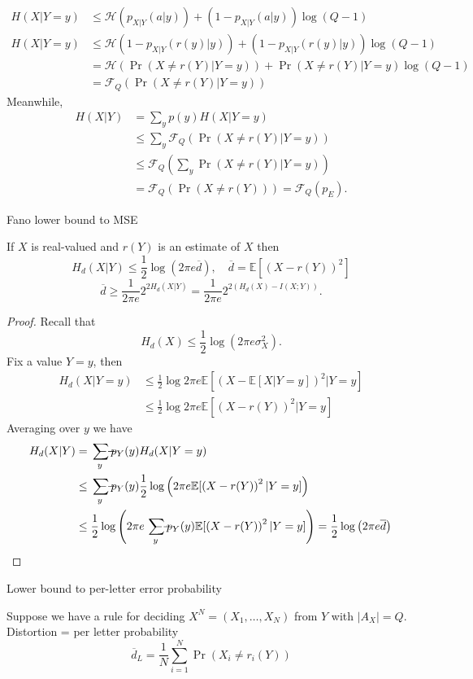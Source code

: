 \documentclass{report}
\newcommand{\matE}{\mathbb{E}}
\def \ssumsym {\mathrlap{\ \ --}\sum}
\DeclareMathOperator*{\ssum}{\ssumsym}
\theoremstyle{definition}
\theoremstyle{remark}
\numberwithin{equation}{section}
\begin{document}
\begin{align*}
  H(X|Y = y) & \leq \mathscr{H}(p_{X|Y}(a|y)) + (1 - p_{X|Y}(a|y))\log(Q - 1) \\
  H(X|Y = y) & \leq \mathscr{H}(1 - p_{X|Y}(r(y)|y)) + (1 - p_{X|Y}(r(y)|y))\log(Q - 1) \\
  & = \mathscr{H}(\Pr(X \neq r(Y)|Y = y)) + \Pr(X \neq r(Y)|Y = y)\log(Q - 1) \\
  & = \mathscr{F}_Q(\Pr(X \neq r(Y)|Y = y))
\end{align*}
Meanwhile, 
\begin{align*}
  H(X | Y) & = \sum_y p(y)H(X|Y = y) \\
  & \leq \sum_y \mathscr{F}_Q(\Pr(X \neq r(Y)|Y = y)) \\
  & \leq \mathscr{F}_Q\left(\sum_y \Pr(X \neq r(Y)|Y = y)\right) \\
  & = \mathscr{F}_Q(\Pr(X \neq r(Y))) = \mathscr{F}_Q(p_E).
\end{align*}

Fano lower bound to MSE

If $X$ is real-valued and $r(Y)$ is an estimate of $X$ then \[
  H_d(X|Y) \leq \frac{1}{2}\log(2\pi e \overline{d}),  \quad \overline{d} = \matE[(X - r(Y))^2]  
  \]\[\overline{d} \geq \frac{1}{2\pi e}2^{2H_d(X|Y)} = \frac{1}{2\pi e}2^{2(H_d(X) - I(X;Y))}.\]

\begin{proof}
  Recall that \[H_d(X) \leq \frac{1}{2}\log (2\pi e \sigma_X^2).\]
  Fix a value $Y = y$, then
  \begin{align*}
    H_d(X|Y = y) & \leq \frac{1}{2} \log 2\pi e \matE[\left(X - \matE[X| Y = y]\right)^2 | Y = y] \\
    & \leq \frac{1}{2} \log 2\pi e \matE[\left(X - r(Y)\right)^2 | Y = y]
  \end{align*}
  Averaging over $y$ we have \begin{align*}
    H_d(X|Y) & = \ssum_y p_Y(y)H_d(X|Y = y) \\
    & \leq \ssum_y p_Y(y)\frac{1}{2}\log\left(2\pi e \matE[\left(X - r(Y)\right)^2 | Y = y]\right) \\
    & \leq \frac{1}{2}\log\left(2\pi e \ssum_y p_Y(y)\matE[\left(X - r(Y)\right)^2 | Y = y]\right) = \frac{1}{2}\log\left(2\pi e \overline{d}\right) \qedhere
  \end{align*}
\end{proof}

Lower bound to per-letter error probability

Suppose we have a rule for deciding $X^N = (X_1, \ldots, X_N)$ from $Y$ with $|A_X| = Q$. 
Distortion = per letter probability \[\overline{d}_L = \frac{1}{N}\sum_{i=1}^N \Pr(X_i \neq r_i(Y))\]
\end{document}
